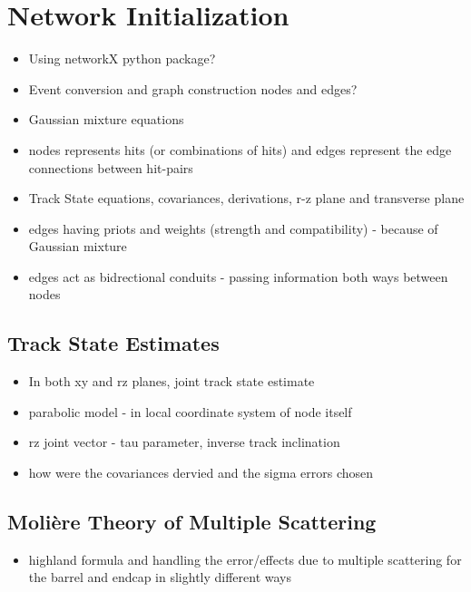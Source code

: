 \section{Network Initialization}
\label{gnn-network-initialization}

\begin{itemize}
\item Using networkX python package?
\item Event conversion and graph construction nodes and edges?
\item Gaussian mixture equations
\item nodes represents hits (or combinations of hits) and edges represent the edge connections between hit-pairs
\item Track State equations, covariances, derivations, r-z plane and transverse plane
\item edges having priots and weights (strength and compatibility) - because of Gaussian mixture
\item edges act as bidrectional conduits - passing information both ways between nodes
\end{itemize}

\subsection{Track State Estimates}
\begin{itemize}
\item In both xy and rz planes, joint track state estimate
\item parabolic model - in local coordinate system of node itself
\item rz joint vector - tau parameter, inverse track inclination
\item how were the covariances dervied and the sigma errors chosen
\end{itemize}

\subsection{Molière Theory of Multiple Scattering}
\begin{itemize}
\item highland formula and handling the error/effects due to multiple scattering for the barrel and endcap in slightly different ways
\end{itemize}



